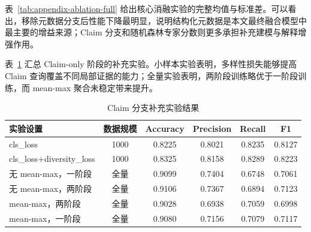 \documentclass[UTF8,oneside,openright,fontset=none]{ctexbook}
\numberwithin{equation}{chapter}
\begin{document}
表~\ref{tab:appendix-ablation-full} 给出核心消融实验的完整均值与标准差。可以看出，移除元数据分支后性能下降最明显，说明结构化元数据是本文最终融合模型中最主要的增益来源；Claim 分支和随机森林专家分数则更多承担补充建模与解释增强作用。

\begin{table}[htbp]
  \centering
  \scriptsize
  \caption{核心模块消融实验完整结果}
  \label{tab:appendix-ablation-full}
\end{table}

表~\ref{tab:appendix-claim-extra} 汇总 Claim-only 阶段的补充实验。小样本实验表明，多样性损失能够提高 Claim 查询覆盖不同局部证据的能力；全量实验表明，两阶段训练略优于一阶段训练，而 mean-max 聚合未稳定带来提升。

\begin{table}[htbp]
  \centering
  \small
  \caption{Claim 分支补充实验结果}
  \label{tab:appendix-claim-extra}
  \begin{tabular}{lccccc}
    \toprule
    实验设置 & 数据规模 & Accuracy & Precision & Recall & F1 \\
    \midrule
    cls\_loss & 1000 & 0.8225 & 0.8021 & 0.8235 & 0.8127 \\
    cls\_loss+diversity\_loss & 1000 & 0.8325 & 0.8158 & 0.8289 & 0.8223 \\
    无 mean-max，一阶段 & 全量 & 0.9099 & 0.7404 & 0.6748 & 0.7061 \\
    无 mean-max，两阶段 & 全量 & 0.9106 & 0.7367 & 0.6894 & 0.7123 \\
    mean-max，两阶段 & 全量 & 0.9028 & 0.6938 & 0.7059 & 0.6998 \\
    mean-max，一阶段 & 全量 & 0.9080 & 0.7156 & 0.7079 & 0.7117 \\
    \bottomrule
  \end{tabular}
\end{table}
\end{document}
